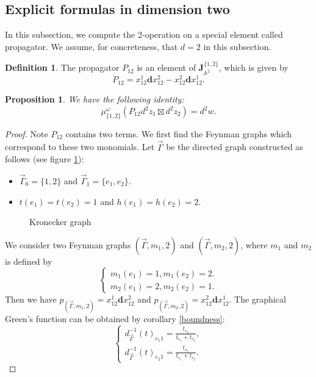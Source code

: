 \documentclass[11pt]{amsart}
\newtheorem{prop}[thm]{Proposition}
\theoremstyle{definition}
\newtheorem{defn}[thm]{Definition}
\theoremstyle{remark}
\numberwithin{equation}{section}
\begin{document}
\subsection{Explicit formulas in dimension two}
In this subsection, we compute the 2-operation on a special element called propagator. 
We assume, for concreteness, that $d=2$ in this subsection.
\begin{defn}
    The propagator $P_{12}$ is an element of $\mathbf{J}^{\{1,2\}}_{\mathbb{A}^{2}}$, which is given by 
    $$
    P_{12}=x_{12}^1\mathbf{d}x_{12}^{2}-x_{12}^2\mathbf{d}x_{12}^{1}.
    $$
    \begin{prop}
        We have the following identity:
        $$
        \mu^{\omega}_{\{1,2\}}(P_{12}d^{2}z_{1}\boxtimes d^{2}z_{2})=d^{2}w.
        $$
    \end{prop}
    \begin{proof}
    Note $P_{12}$ contains two terms. We first find the Feynman graphs which correspond to these two monomials. Let
    $\vec{\Gamma}$ be the directed graph constructed as follows (see figure \ref{fig:kronecker-quiver}):
        \begin{itemize}
            \item $\vec{\Gamma}_{0}=\{1,2\}$ and $\vec{\Gamma}_{1}=\{e_{1},e_{2}\}$.
            \item $t(e_{1})=t(e_{2})=1$ and $h(e_{1})=h(e_{2})=2$.
        \end{itemize}
\begin{figure}[ht]
  \centering
  \caption{Kronecker graph}
  \label{fig:kronecker-quiver}
\end{figure}
        We consider two Feynman graphs $(\vec{\Gamma},m_{1},2)$ and $(\vec{\Gamma},m_{2},2)$, where $m_{1}$ and $m_{2}$ is defined by
        $$
        \begin{cases}
            m_{1}(e_{1})=1, m_{1}(e_{2})=2.\\
            m_{2}(e_{1})=2, m_{2}(e_{2})=1.
        \end{cases}
        $$
        Then we have $p_{(\vec{\Gamma},m_{1},2)}=x_{12}^1\mathbf{d}x_{12}^{2}$ and $p_{(\vec{\Gamma},m_{2},2)}=x_{12}^{2}
        \mathbf{d}x_{12}^{1}$. The graphical Green's function can be obtained by corollary \ref{boundness}:
        $$
        \begin{cases}
            d^{-1}_{\vec{\Gamma}}(t)_{e_{1}1}=\frac{t_{e_{2}}}{t_{e_{1}}+t_{e_{2}}},\\
            d^{-1}_{\vec{\Gamma}}(t)_{e_{2}1}=\frac{t_{e_{1}}}{t_{e_{1}}+t_{e_{2}}}.
        \end{cases}
        $$
        

\end{proof}
\end{defn}
\end{document}
